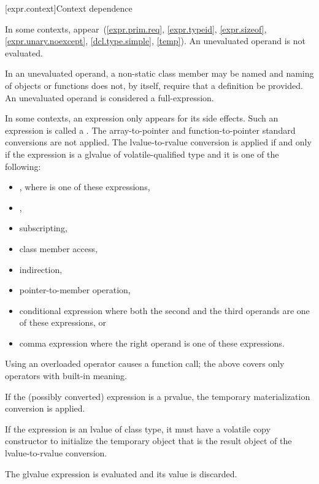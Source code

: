 [expr.context]{Context dependence}

\pnum
In some contexts, 
appear~(\ref{expr.prim.req},
\ref{expr.typeid},
\ref{expr.sizeof},
\ref{expr.unary.noexcept},
\ref{dcl.type.simple},
\ref{temp}).
An unevaluated operand is not evaluated.
\begin{note}
In an unevaluated operand, a non-static class member may be
named and naming of objects or functions does not, by
itself, require that a definition be provided.
An unevaluated operand is considered a full-expression.
\end{note}

\pnum
In some contexts, an expression only appears for its side effects. Such an
expression is called a .
The array-to-pointer
and function-to-pointer standard conversions are not
applied. The lvalue-to-rvalue conversion is applied
if and only if
the expression is a glvalue of volatile-qualified type and it is one of the
following:

\begin{itemize}
\item \tcode{(}  \tcode{)}, where
   is one of these expressions,
\item {},
\item subscripting,
\item class member access,
\item indirection,
\item pointer-to-member operation,
\item conditional expression where both the second and the
      third operands are one of these expressions, or
\item comma expression where the right operand is one of
      these expressions.
\end{itemize}

\begin{note} Using an overloaded operator causes a function call; the
above covers only operators with built-in meaning.
\end{note}
If the (possibly converted) expression is a prvalue,
the temporary materialization conversion is applied.
\begin{note}
If the expression is an lvalue of
class type, it must have a volatile copy constructor to initialize the
temporary object that is the result object of the lvalue-to-rvalue
conversion. \end{note}
The glvalue expression is evaluated and its value is discarded.

